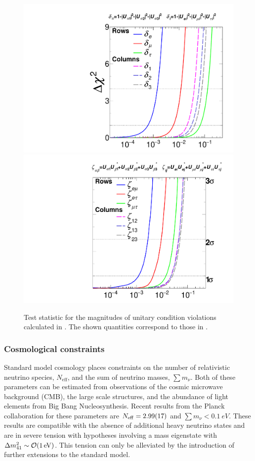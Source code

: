 \begin{figure}
    \centering
    \includegraphics[width=0.49\linewidth]{figures/theory/Norm.pdf}
    \includegraphics[width=0.49\linewidth]{figures/theory/Clos_temp.pdf}
    \caption{Test statistic for the magnitudes of unitary condition violations calculated in \cite{global_unitarity_Hu}. The shown quantities correspond to those in .\label{fig:nonunitary-global-fits}}
\end{figure}

\subsubsection{Cosmological constraints}
Standard model cosmology places constraints on the number of relativistic neutrino species, $N_\mathrm{eff}$, and the sum of neutrino masses, $\sum m_\nu$. Both of these parameters can be estimated from observations of the cosmic microwave background (CMB), the large scale structures, and the abundance of light elements from Big Bang Nucleosynthesis. Recent results from the Planck collaboration for these parameters are $N_\mathrm{eff}=\num{2.99+-0.17}$ and $\sum m_\nu < \SI{0.1}{eV}$. These results are compatible with the absence of additional heavy neutrino states and are in severe tension with hypotheses involving a mass eigenstate with $\Delta m^2_{41} \sim \order{\SI{1}{eV}}$. This tension can only be alleviated by the introduction of further extensions to the standard model.